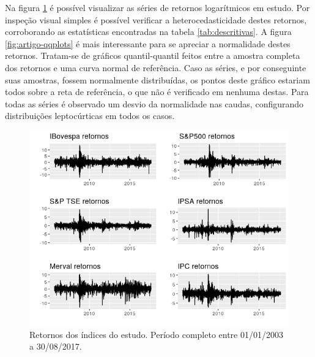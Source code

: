 \documentclass[1p]{elsarticle}
\theoremstyle{definition}
\begin{document}


Na figura \ref{fig:artigo-retornos} é possível visualizar as séries de retornos logarítmicos em estudo. Por inspeção visual simples é possível verificar a heterocedasticidade destes retornos, corroborando as estatísticas encontradas na tabela \ref{tab:descritivas}. A figura \ref{fig:artigo-qqplots} é mais interessante para se apreciar a normalidade destes retornos. Tratam-se de gráficos quantil-quantil feitos entre a amostra completa dos retornos e uma curva normal de referência. Caso as séries, e por conseguinte suas amostras, fossem normalmente distribuídas, os pontos deste gráfico estariam todos sobre a reta de referência, o que não é verificado em nenhuma destas. Para todas as séries é observado um desvio da normalidade nas caudas, configurando distribuições leptocúrticas em todos os casos.

\begin{figure}[H]
	\centering
	\includegraphics[width=1\linewidth]{figs/artigo-retornos}
	\caption{Retornos dos índices do estudo. Período completo entre 01/01/2003 a 30/08/2017.}
	\label{fig:artigo-retornos}
\end{figure}
\end{document}
